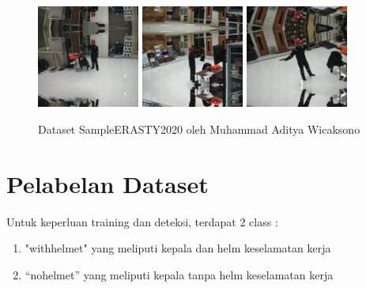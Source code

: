 \begin{enumerate}
  \begin{figure}[ht]
    \centering
    \includegraphics[width=0.3\textwidth]{gambar/sample_erasty/APB-Hat-6-_jpg.rf.79aa17f23c1834efa681edc7aca5cd5f.jpg}
    \includegraphics[width=0.3\textwidth]{gambar/sample_erasty/APB-Hat-7-_jpg.rf.4e9ff94579f598546de38a9b5c88a05d.jpg}
    \includegraphics[width=0.3\textwidth]{gambar/sample_erasty/APB-Hat-8-_jpg.rf.804e2e1de8db16912fbbca9d9cfccff3.jpg}
    \caption{Dataset SampleERASTY2020 oleh Muhammad Aditya Wicaksono}
    \label{fig:dataseterastypreview}  
  \end{figure}

\end{enumerate}

\section{Pelabelan Dataset}
\label{sec:pelabelandataset}
Untuk keperluan training dan deteksi, terdapat 2 class :

\begin{enumerate}[nolistsep]
  \item "with\textunderscore helmet" yang meliputi kepala dan helm keselamatan kerja
  \item “no\textunderscore helmet” yang meliputi kepala tanpa helm keselamatan kerja
\end{enumerate}


